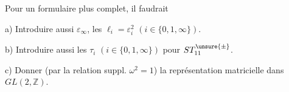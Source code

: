 Pour un formulaire plus complet, il faudrait

a) Introduire aussi $\varepsilon_\infty$,  les $\ell_i=\varepsilon_i^2$ $(i\in\{0,1,\infty\})$.

b) Introduire aussi les $\tau_i$ $(i\in\{0,1,\infty\})$ pour $ST_{11}^{\unsure{\pm}}$.

c) Donner (par la relation suppl. $\omega^2=1$) la représentation matricielle dans $GL(2,\mathbb Z)$.
